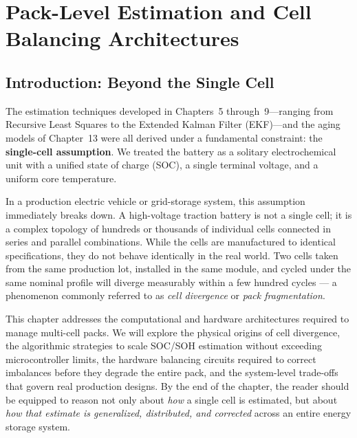 
\chapter{Pack-Level Estimation and Cell Balancing Architectures}
\label{ch:pack_level}

\section{Introduction: Beyond the Single Cell}
\label{sec:14_intro}

The estimation techniques developed in Chapters~5 through~9—ranging from Recursive Least Squares to the Extended Kalman Filter (EKF)—and the aging models of Chapter~13 were all derived under a fundamental constraint: the \textbf{single-cell assumption}. We treated the battery as a solitary electrochemical unit with a unified state of charge (SOC), a single terminal voltage, and a uniform core temperature.

In a production electric vehicle or grid-storage system, this assumption immediately breaks down. A high-voltage traction battery is not a single cell; it is a complex topology of hundreds or thousands of individual cells connected in series and parallel combinations. While the cells are manufactured to identical specifications, they do not behave identically in the real world. Two cells taken from the same production lot, installed in the same module, and cycled under the same nominal profile will diverge measurably within a few hundred cycles — a phenomenon commonly referred to as \emph{cell divergence} or \emph{pack fragmentation}.

This chapter addresses the computational and hardware architectures required to manage multi-cell packs. We will explore the physical origins of cell divergence, the algorithmic strategies to scale SOC/SOH estimation without exceeding microcontroller limits, the hardware balancing circuits required to correct imbalances before they degrade the entire pack, and the system-level trade-offs that govern real production designs. By the end of the chapter, the reader should be equipped to reason not only about \emph{how} a single cell is estimated, but about \emph{how that estimate is generalized, distributed, and corrected} across an entire energy storage system.


